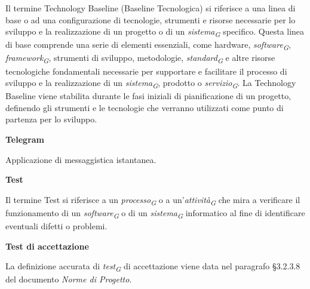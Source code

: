 \documentclass{article}
\begin{document}
\vspace{0.1cm}

Il termine Technology Baseline (Baseline Tecnologica) si riferisce a una linea di base o ad una configurazione di tecnologie, strumenti e risorse necessarie per lo sviluppo e la realizzazione di un progetto o di un \textit{sistema}\textsubscript{\textit{G}} specifico. Questa linea di base comprende una serie di elementi essenziali, come hardware, \textit{software}\textsubscript{\textit{G}}, \textit{framework}\textsubscript{\textit{G}}, strumenti di sviluppo, metodologie, \textit{standard}\textsubscript{\textit{G}} e altre risorse tecnologiche fondamentali necessarie per supportare e facilitare il processo di sviluppo e la realizzazione di un \textit{sistema}\textsubscript{\textit{G}}, prodotto o \textit{servizio}\textsubscript{\textit{G}}. La Technology Baseline viene stabilita durante le fasi iniziali di pianificazione di un progetto, definendo gli strumenti e le tecnologie che verranno utilizzati come punto di partenza per lo sviluppo.

\vspace{0.4cm}

\textbf{Telegram}

\vspace{0.1cm}

Applicazione di messaggistica istantanea.

\vspace{0.4cm}

\textbf{Test}

\vspace{0.1cm}

Il termine Test si riferisce a un \textit{processo}\textsubscript{\textit{G}} o a un'\textit{attività}\textsubscript{\textit{G}} che mira a verificare il funzionamento di un \textit{software}\textsubscript{\textit{G}} o di un \textit{sistema}\textsubscript{\textit{G}} informatico al fine di identificare eventuali difetti o problemi.

\vspace{0.4cm}

\textbf{Test di accettazione}

\vspace{0.1cm}

La definizione accurata di \textit{test}\textsubscript{\textit{G}} di accettazione viene data nel paragrafo §3.2.3.8 del documento \textit{Norme di Progetto}.

\vspace{0.4cm}
\end{document}
